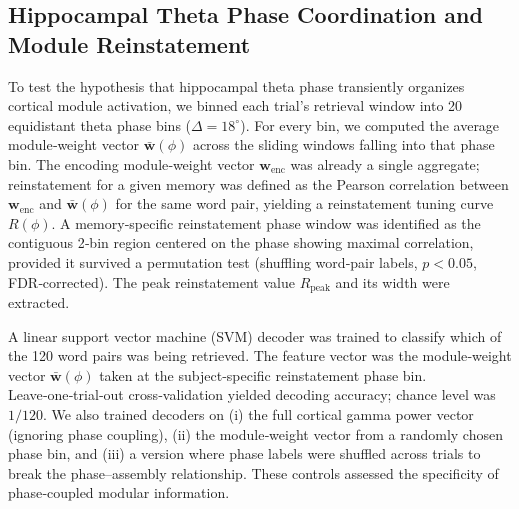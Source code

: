 \documentclass{article}
\begin{document}
\subsection{Hippocampal Theta Phase Coordination and Module Reinstatement}
To test the hypothesis that hippocampal theta phase transiently organizes cortical module activation, we binned each trial’s retrieval window into 20 equidistant theta phase bins ($\Delta = 18^{\circ}$). For every bin, we computed the average module‑weight vector $\bar{\mathbf{w}}(\phi)$ across the sliding windows falling into that phase bin. The encoding module‑weight vector $\mathbf{w}_{\text{enc}}$ was already a single aggregate; reinstatement for a given memory was defined as the Pearson correlation between $\mathbf{w}_{\text{enc}}$ and $\bar{\mathbf{w}}(\phi)$ for the same word pair, yielding a reinstatement tuning curve $R(\phi)$. A memory‑specific reinstatement phase window was identified as the contiguous 2‑bin region centered on the phase showing maximal correlation, provided it survived a permutation test (shuffling word‑pair labels, $p < 0.05$, FDR‑corrected). The peak reinstatement value $R_{\text{peak}}$ and its width were extracted.

A linear support vector machine (SVM) decoder was trained to classify which of the 120 word pairs was being retrieved. The feature vector was the module‑weight vector $\bar{\mathbf{w}}(\phi)$ taken at the subject‑specific reinstatement phase bin. Leave‑one‑trial‑out cross‑validation yielded decoding accuracy; chance level was $1/120$. We also trained decoders on (i) the full cortical gamma power vector (ignoring phase coupling), (ii) the module‑weight vector from a randomly chosen phase bin, and (iii) a version where phase labels were shuffled across trials to break the phase–assembly relationship. These controls assessed the specificity of phase‑coupled modular information.
\end{document}
